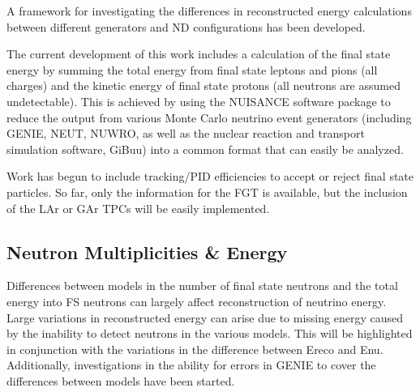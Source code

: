 \documentclass[12pt]{article}
\begin{document}
A framework for investigating the differences in reconstructed energy calculations between different generators and ND configurations has been developed. %

The current development of this work includes a calculation of the final state energy by summing the total energy from final state leptons and pions (all charges) and the kinetic energy of final state protons (all neutrons are assumed undetectable). This is achieved by using the NUISANCE software package to reduce the output from various Monte Carlo neutrino event generators (including GENIE, NEUT, NUWRO, as well as the nuclear reaction and transport simulation software, GiBuu) into a common format that can easily be analyzed. 

Work has begun to include tracking/PID efficiencies to accept or reject final state particles. So far, only the information for the FGT is available, but the inclusion of the LAr or GAr TPCs will be easily implemented. 
%




\subsection{Neutron Multiplicities \& Energy}

Differences between models in the number of final state neutrons and the total energy into FS neutrons can largely affect reconstruction of neutrino energy. Large variations in reconstructed energy can arise due to missing energy caused by the inability to detect neutrons in the various models. This will be highlighted in conjunction with the variations in the difference between Ereco and Enu. Additionally, investigations in the ability for errors in GENIE to cover the differences between models have been started. 
\end{document}
